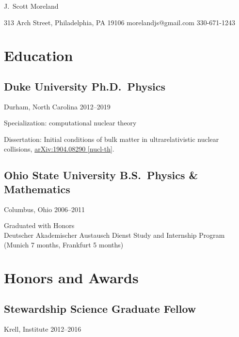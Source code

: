 \documentclass[letterpaper,10pt]{article}
\begin{document}
\newcommand{\sep}{{\quad\textbar\quad}}

\begin{center}
  {\huge\raleway J.\ Scott Moreland}
\end{center}

\begin{center}
  \small 313 Arch Street, Philadelphia, PA 19106 \sep
  morelandjs@gmail.com \sep
  330-671-1243
\end{center}

\smallskip

\newcommand{\subheading}[3]{{\small #1 \hfill #2--#3}}

\begin{multicols}{2}

\section{Education}

\subsection{Duke University \hfill Ph.D.\ Physics}
\subheading{Durham, North Carolina}{2012}{2019}

Specialization: computational nuclear theory

\smallskip

Dissertation: Initial conditions of bulk matter in ultrarelativistic nuclear collisions,
\href{https://arxiv.org/abs/1904.08290}{\small arXiv:1904.08290 [nucl-th]}.

\subsection{Ohio State University \hfill B.S.\ Physics \& Mathematics}
\subheading{Columbus, Ohio}{2006}{2011}

Graduated with Honors\\
Deutscher Akademischer Austausch Dienst Study and Internship Program (Munich 7 months, Frankfurt 5 months)

\section{Honors and Awards}

\subsection{Stewardship Science Graduate Fellow}
\subheading{Krell, Institute}{2012}{2016}


\end{multicols}
\end{document}
